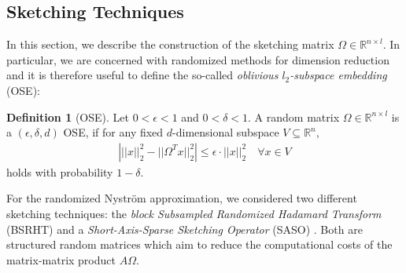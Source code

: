 \documentclass{article}
\theoremstyle{definition}
\newtheorem{definition}{Definition}[section]
\begin{document}
\subsection{Sketching Techniques}
In this section, we describe the construction of the sketching matrix $\Omega
\in \mathbb{R}^{n \times l}$. In particular, we are concerned with randomized
methods for dimension reduction and it is therefore useful to define the
so-called \textit{oblivious $l_2$-subspace embedding} (OSE):
\begin{definition}[OSE]
    Let $0 < \epsilon < 1$ and $0 < \delta < 1$. A random matrix $\Omega \in
    \mathbb{R}^{n \times l}$ is a $(\epsilon, \delta, d)$ OSE, if for any fixed
    $d$-dimensional subspace $V \subseteq \mathbb{R}^{n}$,
    \begin{align*}
        \left| ||x||_2^2 - ||\Omega^T x||_2^2 \right| \leq \epsilon \cdot ||x||_2^2
        \quad \forall x \in V
    \end{align*}
    holds with probability $1 - \delta$.
\end{definition}

For the randomized Nyström approximation, we considered two different sketching
techniques: the \textit{block Subsampled Randomized Hadamard Transform} (BSRHT)
\cite{balabanov2022} and a \textit{Short-Axis-Sparse Sketching Operator} (SASO)
\cite{murray2023}. Both are structured random matrices which aim to reduce the
computational costs of the matrix-matrix product $A \Omega$.\newline
\end{document}
